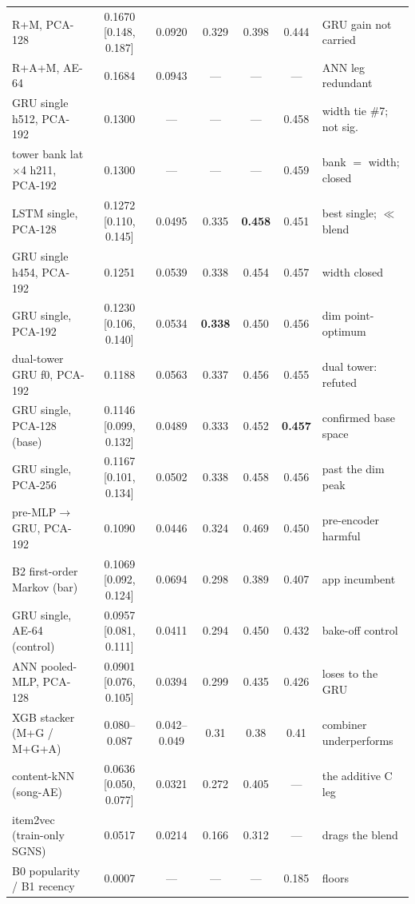 \documentclass[11pt]{article}
\newcommand{\best}[1]{\textbf{#1}}
\begin{document}
\begin{table}[ht]
{\begin{tabular}{lcccccl}
    R+M, PCA-128                          & 0.1670 [0.148, 0.187] & 0.0920 & 0.329 & 0.398 & 0.444 & GRU gain not carried \\
    R+A+M, AE-64                          & 0.1684 & 0.0943 & --- & --- & --- & ANN leg redundant \\
    GRU single h512, PCA-192          & 0.1300 & --- & --- & --- & 0.458 & width tie \#7; not sig.\ \\
    tower bank lat$\times$4 h211, PCA-192 & 0.1300 & --- & --- & --- & 0.459 & bank $=$ width; closed \\
    LSTM single, PCA-128                  & 0.1272 [0.110, 0.145] & 0.0495 & 0.335 & \best{0.458} & 0.451 & best single; $\ll$ blend \\
    GRU single h454, PCA-192          & 0.1251 & 0.0539 & 0.338 & 0.454 & 0.457 & width closed \\
    GRU single, PCA-192                   & 0.1230 [0.106, 0.140] & 0.0534 & \best{0.338} & 0.450 & 0.456 & dim point-optimum \\
    dual-tower GRU f0, PCA-192        & 0.1188 & 0.0563 & 0.337 & 0.456 & 0.455 & dual tower: refuted \\
    GRU single, PCA-128 (base)            & 0.1146 [0.099, 0.132] & 0.0489 & 0.333 & 0.452 & \best{0.457} & confirmed base space \\
    GRU single, PCA-256                   & 0.1167 [0.101, 0.134] & 0.0502 & 0.338 & 0.458 & 0.456 & past the dim peak \\
    pre-MLP$\to$GRU, PCA-192          & 0.1090 & 0.0446 & 0.324 & 0.469 & 0.450 & pre-encoder harmful \\
    B2 first-order Markov (bar)           & 0.1069 [0.092, 0.124] & 0.0694 & 0.298 & 0.389 & 0.407 & app incumbent \\
    GRU single, AE-64 (control)           & 0.0957 [0.081, 0.111] & 0.0411 & 0.294 & 0.450 & 0.432 & bake-off control \\
    ANN pooled-MLP, PCA-128               & 0.0901 [0.076, 0.105] & 0.0394 & 0.299 & 0.435 & 0.426 & loses to the GRU \\
    XGB stacker (M+G / M+G+A)             & 0.080--0.087 & 0.042--0.049 & 0.31 & 0.38 & 0.41 & combiner underperforms \\
    content-kNN (song-AE)                 & 0.0636 [0.050, 0.077] & 0.0321 & 0.272 & 0.405 & --- & the additive C leg \\
    item2vec (train-only SGNS)            & 0.0517 & 0.0214 & 0.166 & 0.312 & --- & drags the blend \\
    B0 popularity / B1 recency            & 0.0007 & --- & --- & --- & 0.185 & floors \\
    \bottomrule
  \end{tabular}}
\end{table}
\end{document}
